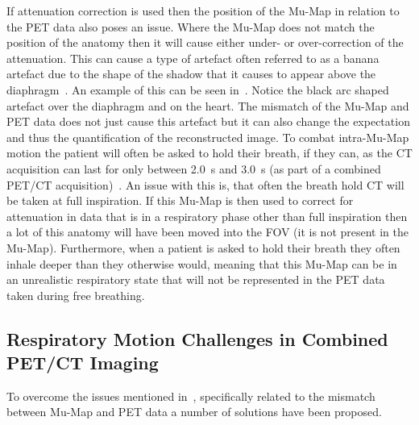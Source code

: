             If attenuation correction is used then the position of the \gls{Mu-Map} in relation to the \gls{PET} data also poses an issue. Where the \gls{Mu-Map} does not match the position of the anatomy then it will cause either under- or over-correction of the attenuation. This can cause a type of artefact often referred to as a banana artefact due to the shape of the shadow that it causes to appear above the diaphragm~\parencite{LungMotionDiaphragmBaiBib}. An example of this can be seen in~. Notice the black arc shaped artefact over the diaphragm and on the heart. The mismatch of the \gls{Mu-Map} and \gls{PET} data does not just cause this artefact but it can also change the expectation and thus the quantification of the reconstructed image. To combat intra-\gls{Mu-Map} motion the patient will often be asked to hold their breath, if they can, as the \gls{CT} acquisition can last for only between \SI{2.0}{\second} and \SI{3.0}{\second} (as part of a combined \gls{PET}/\gls{CT} acquisition)~\parencite{Nyflot2015}. An issue with this is, that often the breath hold \gls{CT} will be taken at full inspiration. If this \gls{Mu-Map} is then used to correct for attenuation in data that is in a respiratory phase other than full inspiration then a lot of this anatomy will have been moved into the \gls{FOV} (it is not present in the \gls{Mu-Map}). Furthermore, when a patient is asked to hold their breath they often inhale deeper than they otherwise would, meaning that this \gls{Mu-Map} can be in an unrealistic respiratory state that will not be represented in the \gls{PET} data taken during free breathing. %
            
        \subsection{Respiratory Motion Challenges in Combined PET/CT Imaging} \label{sec:respiratory_motion_challenges_in_combined_pet_ct_imaging}
            To overcome the issues mentioned in~, specifically related to the mismatch between \gls{Mu-Map} and \gls{PET} data a number of solutions have been proposed.
            
